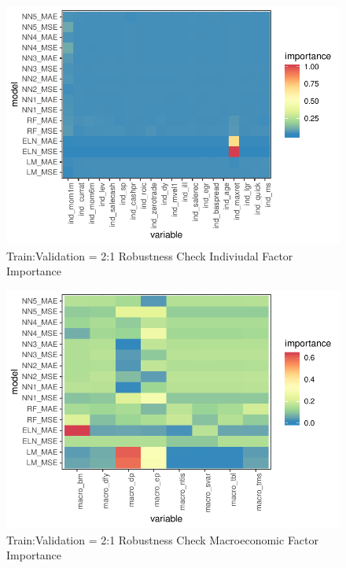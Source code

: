 \documentclass[11pt, a4paper, table]{article}
\begin{document}

\begin{figure}
	\includegraphics[]{../Results/empirical_train_valid_2/empirical_all_sample_vi_ind.pdf}
	\caption{Train:Validation = 2:1 Robustness Check Indiviudal Factor Importance}
\end{figure}

\begin{figure}
	\includegraphics[]{../Results/empirical_train_valid_2/empirical_sample_all_vi_macro.pdf}
	\caption{Train:Validation = 2:1 Robustness Check Macroeconomic Factor Importance}
\end{figure}

\end{document}
